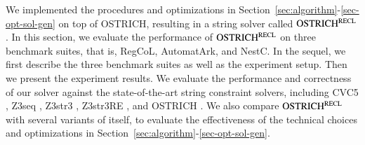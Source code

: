
We implemented the procedures and optimizations in Section~\ref{sec:algorithm}-\ref{sec-opt-sol-gen} on top of OSTRICH, resulting in a string solver called $\rm OSTRICH^{RECL}$. 
%
In this section, we evaluate the performance of $\rm OSTRICH^{RECL}$ on three benchmark suites, that is, RegCoL, AutomatArk, and NestC. In the sequel, we first describe the three benchmark suites as well as the experiment setup. Then we present the experiment results. We evaluate the performance and correctness of our solver against the state-of-the-art string constraint solvers, including CVC5 \cite{cvc5}, Z3seq \cite{z3seq}, Z3str3 \cite{Z3-str3}, Z3str3RE \cite{BD+23}, and OSTRICH \cite{CHL+19}. We also compare $\rm OSTRICH^{RECL}$ with several variants of itself, to evaluate the effectiveness of the technical choices and optimizations in Section~\ref{sec:algorithm}-\ref{sec-opt-sol-gen}.

 




